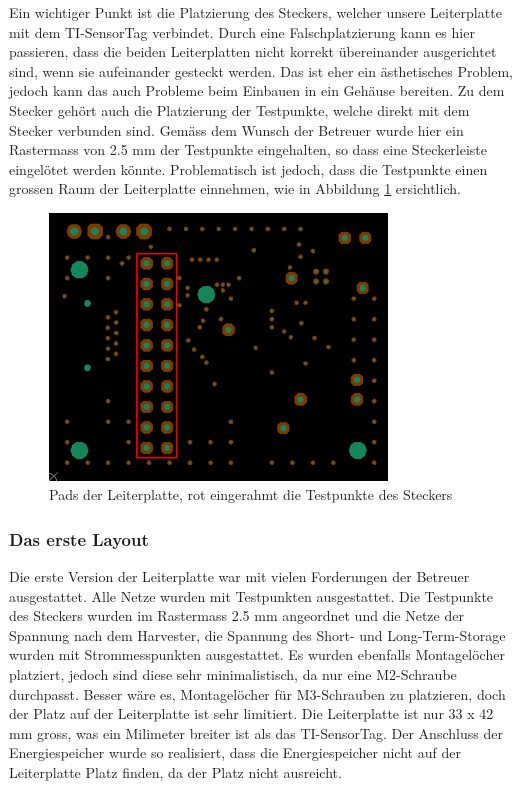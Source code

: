 \begin{minipage}{1\textwidth}
Ein wichtiger Punkt ist die Platzierung des Steckers, welcher unsere Leiterplatte mit dem TI-SensorTag verbindet. Durch eine Falschplatzierung kann es hier passieren, dass die beiden Leiterplatten nicht korrekt übereinander ausgerichtet sind, wenn sie aufeinander gesteckt werden. Das ist eher ein ästhetisches Problem, jedoch kann das auch Probleme beim Einbauen in ein Gehäuse bereiten. Zu dem Stecker gehört auch die Platzierung der Testpunkte, welche direkt mit dem Stecker verbunden sind. Gemäss dem Wunsch der Betreuer wurde hier ein Rastermass von 2.5 mm der Testpunkte eingehalten, so dass eine Steckerleiste eingelötet werden könnte. Problematisch ist jedoch, dass die Testpunkte einen grossen Raum der Leiterplatte einnehmen, wie in Abbildung \ref{layout_testpunkteraster} ersichtlich.
\end{minipage}

\begin{figure}[ht]
    \includegraphics[width=0.8\textwidth]{3Vorgehen/imag/Layout_Testpunkteraster.png}
    \caption{Pads der Leiterplatte, rot eingerahmt die Testpunkte des Steckers}\label{layout_testpunkteraster} 
\end{figure}

\subsubsection{Das erste Layout}

Die erste Version der Leiterplatte war mit vielen Forderungen der Betreuer ausgestattet. Alle Netze wurden mit Testpunkten ausgestattet. Die Testpunkte des Steckers wurden im Rastermass 2.5 mm angeordnet und die Netze der Spannung nach dem Harvester, die Spannung des Short- und Long-Term-Storage wurden mit Strommesspunkten ausgestattet. Es wurden ebenfalls Montagelöcher platziert, jedoch sind diese sehr minimalistisch, da nur eine M2-Schraube durchpasst. Besser wäre es, Montagelöcher für M3-Schrauben zu platzieren, doch der Platz auf der Leiterplatte ist sehr limitiert. Die Leiterplatte ist nur 33 x 42 mm gross, was ein Milimeter breiter ist als das TI-SensorTag. Der Anschluss der Energiespeicher wurde so realisiert, dass die Energiespeicher nicht auf der Leiterplatte Platz finden, da der Platz nicht ausreicht.


